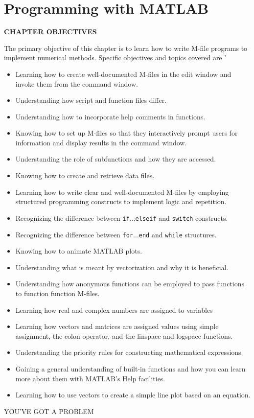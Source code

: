 \documentclass[../main.tex]{subfiles}
\begin{document}
\chapter{Programming with MATLAB}

\label{cha:cha3}


\begin{center}
\Large{\textbf{CHAPTER OBJECTIVES}}
\end{center}

\normalsize{The primary objective of this chapter is to learn how to write M-file programs to
implement numerical methods. Specific objectives and topics covered are}
'
\begin{itemize}

    \item Learning how to create well-documented M-files in the edit window and invoke
    them from the command window.
    \item Understanding how script and function files differ.
    \item Understanding how to incorporate help comments in functions.
    \item Knowing how to set up M-files so that they interactively prompt users for
    information and display results in the command window.
    \item Understanding the role of subfunctions and how they are accessed.
    \item Knowing how to create and retrieve data files.
    \item Learning how to write clear and well-documented M-files by employing
    structured programming constructs to implement logic and repetition.
    \item Recognizing the difference between \texttt{if$\ldots$elseif} and \texttt{switch} constructs.
    \item Recognizing the difference between \texttt{for$\ldots$end} and \texttt{while} structures.
    \item Knowing how to animate MATLAB plots.
    \item Understanding what is meant by vectorization and why it is beneficial.
    \item Understanding how anonymous functions can be employed to pass functions to
    function function M-files.

	\item Learning how real and complex numbers are assigned to variables
	\item  Learning how vectors and matrices are assigned values using simple assignment,
the colon operator, and the linspace and logspace functions.
\item  Understanding the priority rules for constructing mathematical expressions.
\item  Gaining a general understanding of built-in functions and how you can learn more
about them with MATLAB's Help facilities.
\item  Learning how to use vectors to create a simple line plot based on an equation.
\end{itemize}
\bigskip
\bigskip
\Large{YOU'VE GOT A PROBLEM}
\normalsize
\end{document}
